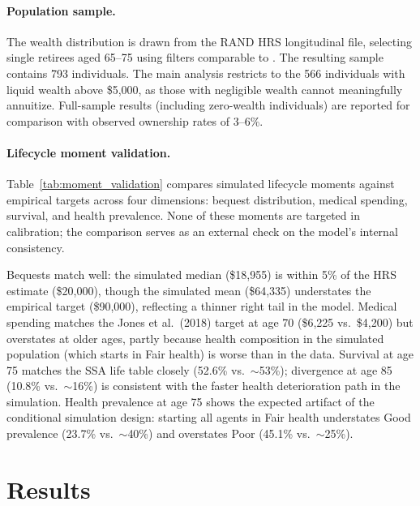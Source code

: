 \documentclass[12pt]{article}
\begin{document}
\paragraph{Population sample.} The wealth distribution is drawn from the RAND HRS longitudinal file, selecting single retirees aged 65--75 using filters comparable to \citet{lockwood2012}. The resulting sample contains 793 individuals. The main analysis restricts to the 566 individuals with liquid wealth above \$5,000, as those with negligible wealth cannot meaningfully annuitize. Full-sample results (including zero-wealth individuals) are reported for comparison with observed ownership rates of 3--6\%.

\paragraph{Lifecycle moment validation.} Table~\ref{tab:moment_validation} compares simulated lifecycle moments against empirical targets across four dimensions: bequest distribution, medical spending, survival, and health prevalence. None of these moments are targeted in calibration; the comparison serves as an external check on the model's internal consistency.

Bequests match well: the simulated median (\$18,955) is within 5\% of the HRS estimate (\$20,000), though the simulated mean (\$64,335) understates the empirical target (\$90,000), reflecting a thinner right tail in the model. Medical spending matches the Jones et al.\ (2018) target at age 70 (\$6,225 vs.\ \$4,200) but overstates at older ages, partly because health composition in the simulated population (which starts in Fair health) is worse than in the data. Survival at age 75 matches the SSA life table closely (52.6\% vs.\ $\sim$53\%); divergence at age 85 (10.8\% vs.\ $\sim$16\%) is consistent with the faster health deterioration path in the simulation. Health prevalence at age 75 shows the expected artifact of the conditional simulation design: starting all agents in Fair health understates Good prevalence (23.7\% vs.\ $\sim$40\%) and overstates Poor (45.1\% vs.\ $\sim$25\%).




\section{Results}
\label{sec:results}
\end{document}
